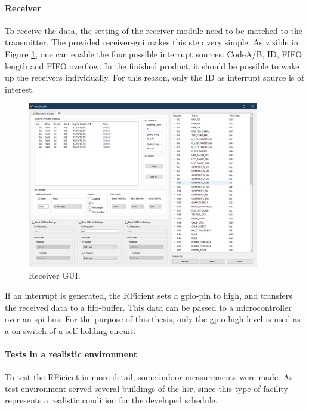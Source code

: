 \paragraph{Receiver}
To receive the data, the setting of the receiver module need to be matched to the transmitter.
The provided receiver-\acs{gui} makes this step very simple.
As visible in Figure \ref{development:rx}, one can enable the four possible interrupt sources: CodeA/B, ID, FIFO length and FIFO overflow.
In the finished product, it should be possible to wake up the receivers individually.
For this reason, only the ID as interrupt source is of interest.
\begin{figure}[ht]
	\centering
	\includegraphics[width=0.9\textwidth]{4-development/hardware/graphics/RXgui.png}
	\caption{Receiver GUI.\label{development:rx}}
\end{figure}
If an interrupt is generated, the RFicient sets a \acs{gpio}-pin to high, and transfers the received data to a \acs{fifo}-buffer.
This data can be passed to a microcontroller over an \acs{spi}-bus.
For the purpose of this thesis, only the \acs{gpio} high level is used as a on switch of a self-holding circuit.

\paragraph{Tests in a realistic environment}
To test the RFicient in more detail, some indoor measurements were made.
As test environment served several buildings of the \acf{hsr}, since this type of facility represents a realistic condition for the developed schedule.

